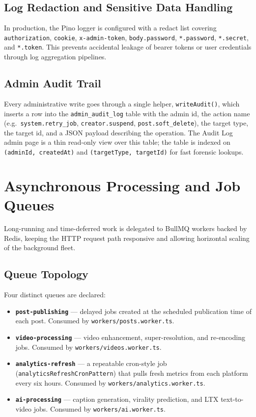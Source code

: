 \subsection{Log Redaction and Sensitive Data Handling}

In production, the Pino logger is configured with a redact list covering \texttt{authorization}, \texttt{cookie}, \texttt{x-admin-token}, \texttt{body.password}, \texttt{*.password}, \texttt{*.secret}, and \texttt{*.token}. This prevents accidental leakage of bearer tokens or user credentials through log aggregation pipelines.

\subsection{Admin Audit Trail}

Every administrative write goes through a single helper, \texttt{writeAudit()}, which inserts a row into the \texttt{admin\_audit\_log} table with the admin id, the action name (e.g.\ \texttt{system.retry\_job}, \texttt{creator.suspend}, \texttt{post.soft\_delete}), the target type, the target id, and a JSON payload describing the operation. The Audit Log admin page is a thin read-only view over this table; the table is indexed on \texttt{(adminId, createdAt)} and \texttt{(targetType, targetId)} for fast forensic lookups.

\section{Asynchronous Processing and Job Queues}

Long-running and time-deferred work is delegated to BullMQ workers backed by Redis, keeping the HTTP request path responsive and allowing horizontal scaling of the background fleet.

\subsection{Queue Topology}

Four distinct queues are declared:

\begin{itemize}
    \item \textbf{\texttt{post-publishing}} --- delayed jobs created at the scheduled publication time of each post. Consumed by \texttt{workers/posts.worker.ts}.
    \item \textbf{\texttt{video-processing}} --- video enhancement, super-resolution, and re-encoding jobs. Consumed by \texttt{workers/videos.worker.ts}.
    \item \textbf{\texttt{analytics-refresh}} --- a repeatable cron-style job (\texttt{analyticsRefreshCronPattern}) that pulls fresh metrics from each platform every six hours. Consumed by \texttt{workers/analytics.worker.ts}.
    \item \textbf{\texttt{ai-processing}} --- caption generation, virality prediction, and LTX text-to-video jobs. Consumed by \texttt{workers/ai.worker.ts}.
\end{itemize}

